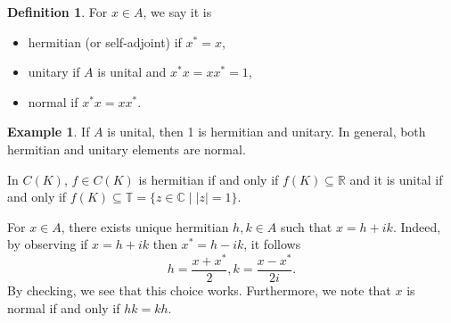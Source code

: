 \documentclass[]{article}
\theoremstyle{definition}
\newtheorem{definition}{Definition}[section]
\newtheorem{example}{Example}[section]
\begin{document}
\begin{definition}
  For \(x \in A\), we say it is
  \begin{itemize}
    \item hermitian (or self-adjoint) if \(x^* = x\),
    \item unitary if \(A\) is unital and \(x^*x = x x^* = 1\),
    \item normal if \(x^*x = x x^*\).
  \end{itemize}
\end{definition}

\begin{example}
  If \(A\) is unital, then 1 is hermitian and unitary. In general, both hermitian and unitary elements 
  are normal.
\end{example}

In \(C(K)\), \(f \in C(K)\) is hermitian if and only if \(f(K) \subseteq \mathbb{R}\) and it is 
unital if and only if \(f(K) \subseteq \mathbb{T} = \{z \in \mathbb{C} \mid |z| = 1\}\).

For \(x \in A\), there exists unique hermitian \(h, k \in A\) such that \(x = h + ik\). Indeed, 
by observing if \(x = h + ik\) then \(x^* = h - ik\), it follows 
\[h = \frac{x + x^*}{2}, k = \frac{x - x^*}{2i}.\]
By checking, we see that this choice works. 
Furthermore, we note that \(x\) is normal if and only if \(hk = kh\).
\end{document}
